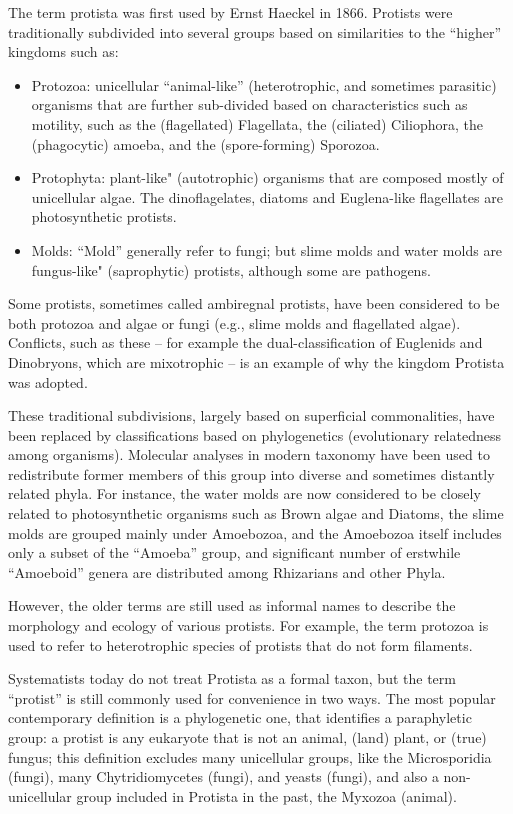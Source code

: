 The term protista was first used by Ernst Haeckel in 1866. Protists were traditionally subdivided into several groups based on similarities to the ``higher'' kingdoms such as:

\begin{itemize}
\tightlist
\item
  Protozoa: unicellular ``animal-like'' (heterotrophic, and sometimes parasitic) organisms that are further sub-divided based on characteristics such as motility, such as the (flagellated) Flagellata, the (ciliated) Ciliophora, the (phagocytic) amoeba, and the (spore-forming) Sporozoa.
\item
  Protophyta: plant-like" (autotrophic) organisms that are composed mostly of unicellular algae. The dinoflagelates, diatoms and Euglena-like flagellates are photosynthetic protists.
\item
  Molds: ``Mold'' generally refer to fungi; but slime molds and water molds are fungus-like" (saprophytic) protists, although some are pathogens.
\end{itemize}

Some protists, sometimes called ambiregnal protists, have been considered to be both protozoa and algae or fungi (e.g., slime molds and flagellated algae). Conflicts, such as these -- for example the dual-classification of Euglenids and Dinobryons, which are mixotrophic -- is an example of why the kingdom Protista was adopted.

These traditional subdivisions, largely based on superficial commonalities, have been replaced by classifications based on phylogenetics (evolutionary relatedness among organisms). Molecular analyses in modern taxonomy have been used to redistribute former members of this group into diverse and sometimes distantly related phyla. For instance, the water molds are now considered to be closely related to photosynthetic organisms such as Brown algae and Diatoms, the slime molds are grouped mainly under Amoebozoa, and the Amoebozoa itself includes only a subset of the ``Amoeba'' group, and significant number of erstwhile ``Amoeboid'' genera are distributed among Rhizarians and other Phyla.

However, the older terms are still used as informal names to describe the morphology and ecology of various protists. For example, the term protozoa is used to refer to heterotrophic species of protists that do not form filaments.

Systematists today do not treat Protista as a formal taxon, but the term ``protist'' is still commonly used for convenience in two ways. The most popular contemporary definition is a phylogenetic one, that identifies a paraphyletic group: a protist is any eukaryote that is not an animal, (land) plant, or (true) fungus; this definition excludes many unicellular groups, like the Microsporidia (fungi), many Chytridiomycetes (fungi), and yeasts (fungi), and also a non-unicellular group included in Protista in the past, the Myxozoa (animal).

